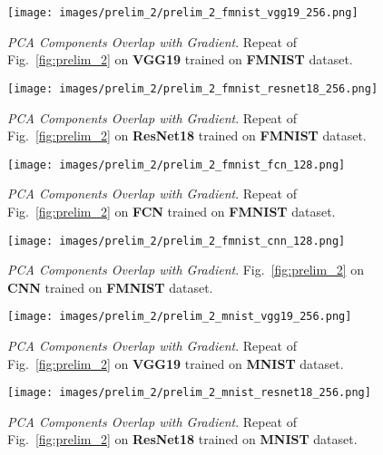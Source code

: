 \begin{figure}[h!]
  \centering
  \centerline{\texttt{[image: images/prelim\_2/prelim\_2\_fmnist\_vgg19\_256.png]}}
  \caption{\small{\textit{PCA Components Overlap with Gradient}. Repeat of Fig.~\ref{fig:prelim_2} on \textbf{VGG19} trained on \textbf{FMNIST} dataset.}}
  \label{fig:prelim_2_fmnist_vgg19}
\end{figure}

\begin{figure}[h!]
  \centering
  \centerline{\texttt{[image: images/prelim\_2/prelim\_2\_fmnist\_resnet18\_256.png]}}
  \caption{\small{\textit{PCA Components Overlap with Gradient}. Repeat of Fig.~\ref{fig:prelim_2} on \textbf{ResNet18} trained on \textbf{FMNIST} dataset.}}
  \label{fig:prelim_2_fmnist_resnet18}
\end{figure}

\begin{figure}[h!]
  \centering
  \centerline{\texttt{[image: images/prelim\_2/prelim\_2\_fmnist\_fcn\_128.png]}}
  \caption{\small{\textit{PCA Components Overlap with Gradient}. Repeat of Fig.~\ref{fig:prelim_2} on \textbf{FCN} trained on \textbf{FMNIST} dataset.}}
  \label{fig:prelim_2_fmnist_fcn}
\end{figure}

\begin{figure}[h!]
  \centering
  \centerline{\texttt{[image: images/prelim\_2/prelim\_2\_fmnist\_cnn\_128.png]}}
  \caption{\small{\textit{PCA Components Overlap with Gradient}. Fig.~\ref{fig:prelim_2} on \textbf{CNN} trained on \textbf{FMNIST} dataset.}}
  \label{fig:prelim_2_fmnist_cnn}
\end{figure}

\clearpage

\begin{figure}[h!]
  \centering
  \centerline{\texttt{[image: images/prelim\_2/prelim\_2\_mnist\_vgg19\_256.png]}}
  \caption{\small{\textit{PCA Components Overlap with Gradient}. Repeat of Fig.~\ref{fig:prelim_2} on \textbf{VGG19} trained on \textbf{MNIST} dataset.}}
  \label{fig:prelim_2_mnist_vgg19}
\end{figure}

\begin{figure}[h!]
  \centering
  \centerline{\texttt{[image: images/prelim\_2/prelim\_2\_mnist\_resnet18\_256.png]}}
  \caption{\small{\textit{PCA Components Overlap with Gradient}. Repeat of Fig.~\ref{fig:prelim_2} on \textbf{ResNet18} trained on \textbf{MNIST} dataset.}}
  \label{fig:prelim_2_mnist_resnet18}
\end{figure}

